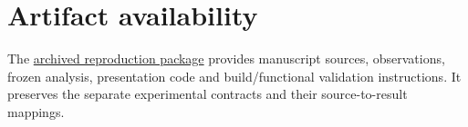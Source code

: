 \section*{Artifact availability}
The \href{https://github.com/sea0114/single-query-packed-multi-record-xpir-for-JISA/tree/bc13e9b67a5f9a8229664362be280cf81fbe43a8}{archived reproduction package}
provides manuscript sources, observations, frozen analysis, presentation
code and build/functional validation instructions. It preserves the
separate experimental contracts and their source-to-result mappings.
